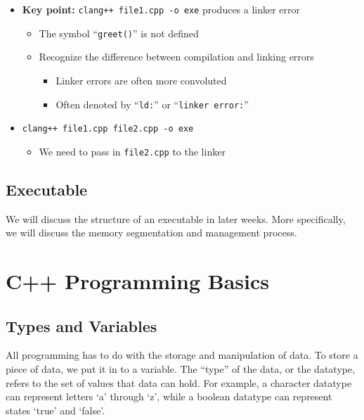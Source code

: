 \documentclass{article}
\begin{document}




\begin{itemize}
	\item \textbf{Key point:} \texttt{clang++ file1.cpp -o exe} produces a linker error \begin{itemize}
		\item The symbol ``\texttt{greet()}'' is not defined
		\item Recognize the difference between compilation and linking errors \begin{itemize}
			\item Linker errors are often more convoluted
			\item Often denoted by ``\texttt{ld:}'' or ``\texttt{linker error:}'' 
		\end{itemize}
	\end{itemize}
	\item \texttt{clang++ file1.cpp file2.cpp -o exe} \begin{itemize}
		\item We need to pass in \texttt{file2.cpp} to the linker
	\end{itemize}
\end{itemize}

\subsection{Executable}

\noindent
We will discuss the structure of an executable in later weeks. More specifically, we will discuss the memory segmentation and management process.

\section{C++ Programming Basics}

\subsection{Types and Variables}

\noindent
All programming has to do with the storage and manipulation of data. To store a piece of data, we put it in to a variable. The ``type'' of the data, or the datatype, refers to the set of values that data can hold. For example, a character datatype can represent letters `a' through `z', while a boolean datatype can represent states `true' and `false'.
\end{document}
